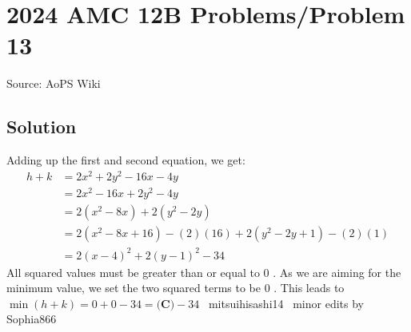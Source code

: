 \documentclass[12pt]{article}
\begin{document}
\section*{{2024 AMC 12B Problems/Problem 13}}
Source: AoPS Wiki

\subsection*{Solution}
Adding up the first and second equation, we get: \begin{align*} h + k &= 2x^2 + 2y^2 - 16x - 4y \\ &= 2x^2 - 16x + 2y^2 - 4y \\ &= 2(x^2 - 8x) + 2(y^2 - 2y) \\ &= 2(x^2 - 8x + 16) - (2)(16) + 2(y^2 - 2y + 1) - (2)(1) \\ &= 2(x - 4)^2 + 2(y - 1)^2 - 34 \end{align*} All squared values must be greater than or equal to $0$ . As we are aiming for the minimum value, we set the two squared terms to be $0$ . This leads to $\min(h + k) = 0 + 0 - 34 = \boxed{\textbf{(C)} -34}$ ~mitsuihisashi14
~minor edits by Sophia866
\end{document}
